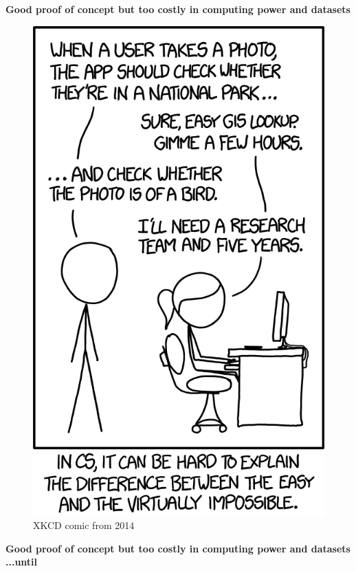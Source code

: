 \documentclass{irdbeamer}
\begin{document}
\begin{frame}[t]{}
\textbf{\large Good proof of concept but too costly in computing power and datasets}
    \begin{figure}
        \centering
        \includegraphics[width=.27\linewidth]{figs/xkcd_photo_is_a_bird.png}
    \vspace{-.5cm}
        \caption{\tiny XKCD comic from 2014}
    \end{figure}
\end{frame}
\begin{frame}[t]{}
\textbf{\large Good proof of concept but too costly in computing power and datasets}
\textbf{\large  ...until}

\end{frame}
\end{document}
